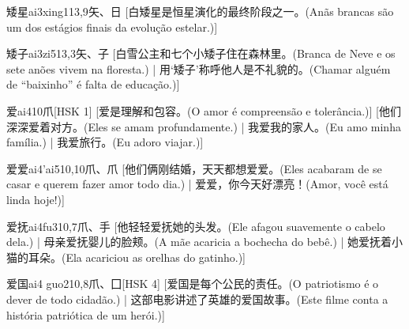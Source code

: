 \begin{entry}{矮星}{ai3xing1}{13,9}{⽮、⽇}
  [白矮星是恒星演化的最终阶段之一。(Anãs brancas são um dos estágios finais da evolução estelar.)]
\end{entry}

\begin{entry}{矮子}{ai3zi5}{13,3}{⽮、⼦}
  [白雪公主和七个小矮子住在森林里。(Branca de Neve e os sete anões vivem na floresta.) | 用`矮子'称呼他人是不礼貌的。(Chamar alguém de ``baixinho'' é falta de educação.)]
\end{entry}

\begin{entry}{爱}{ai4}{10}{⽖}[HSK 1]
  [爱是理解和包容。(O amor é compreensão e tolerância.)]
  [他们深深爱着对方。(Eles se amam profundamente.) | 我爱我的家人。(Eu amo minha família.) | 我爱旅行。(Eu adoro viajar.)]
\end{entry}

\begin{entry}{爱爱}{ai4'ai5}{10,10}{⽖、⽖}
  [他们俩刚结婚，天天都想爱爱。(Eles acabaram de se casar e querem fazer amor todo dia.) | 爱爱，你今天好漂亮！(Amor, você está linda hoje!)]
\end{entry}

\begin{entry}{爱抚}{ai4fu3}{10,7}{⽖、⼿}
  [他轻轻爱抚她的头发。(Ele afagou suavemente o cabelo dela.) | 母亲爱抚婴儿的脸颊。(A mãe acaricia a bochecha do bebê.) | 她爱抚着小猫的耳朵。(Ela acariciou as orelhas do gatinho.)]
\end{entry}

\begin{entry}{爱国}{ai4 guo2}{10,8}{⽖、⼞}[HSK 4]
  [爱国是每个公民的责任。(O patriotismo é o dever de todo cidadão.) | 这部电影讲述了英雄的爱国故事。(Este filme conta a história patriótica de um herói.)]
\end{entry}

